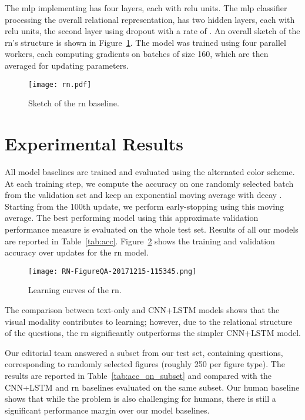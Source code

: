 \documentclass{article} \usepackage{iclr2018_workshop,times}
\begin{document}
The \gls{mlp} implementing  has four layers, each with  \gls{relu} units. The \gls{mlp} classifier  processing the overall relational representation, has two hidden layers, each with  \gls{relu} units, the second layer using dropout with a rate of .
An overall sketch of the \gls{rn}'s structure is shown in Figure~\ref{fig:rn}. The model was trained using four parallel workers, each computing gradients on batches of size 160, which are then averaged for updating parameters.

\begin{figure}[h]
    \centering
    \texttt{[image: rn.pdf]}
    \caption{Sketch of the \gls{rn} baseline.}
    \label{fig:rn}
\end{figure}

\FloatBarrier

\section{Experimental Results}
All model baselines are trained and evaluated using the alternated color scheme.
At each training step, we compute the accuracy on one randomly selected batch from the validation set and keep an exponential moving average with decay .
Starting from the 100th update, we perform early-stopping using this moving average.
The best performing model using this approximate validation performance measure is evaluated on the whole test set. Results of all our models are reported in Table~\ref{tab:acc}.
Figure~\ref{fig:rn_learning_curve} shows the training and validation accuracy over updates for the \gls{rn} model.
\begin{figure}[h]
    \centering
    \texttt{[image: RN-FigureQA-20171215-115345.png]}
    \caption{Learning curves of the \gls{rn}.}
    \label{fig:rn_learning_curve}
\end{figure}

The comparison between text-only and CNN+LSTM models shows that the visual modality contributes to learning; however, due to the relational structure of the questions, the \gls{rn} significantly outperforms the simpler CNN+LSTM model.

Our editorial team answered a subset from our test set, containing  questions, corresponding to  randomly selected figures (roughly 250 per figure type).
The results are reported in Table~\ref{tab:acc_on_subset} and compared with the CNN+LSTM and \gls{rn} baselines evaluated on the same subset.
Our human baseline shows that while the problem is also challenging for humans, there is still a significant performance margin over our model baselines.
\end{document}
